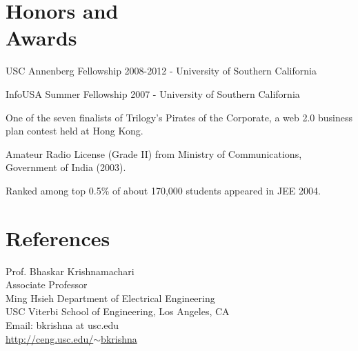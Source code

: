 \documentclass[margin,line]{resume}
\begin{document}
\begin{resume}
    
\section{\mysidestyle Honors and\\Awards} 
\begin{list2}
	  \item USC Annenberg Fellowship 2008-2012	- University of Southern California
          \item InfoUSA Summer Fellowship 2007	- University of Southern California %
	  \item One of the seven finalists of Trilogy's Pirates of the Corporate, a web 2.0 business plan contest held at Hong Kong. %
	  \item Amateur Radio License (Grade II) from Ministry of Communications, Government of India (2003).%
	  \item Ranked among top 0.5\% of about 170,000 students appeared in JEE 2004. \\%
\end{list2}
  

\section{\mysidestyle References} 
Prof. Bhaskar Krishnamachari \\
Associate Professor \\
Ming Hsieh Department of Electrical Engineering \\
USC Viterbi School of Engineering, Los Angeles, CA \\
Email: bkrishna at usc.edu \\
\href{http://ceng.usc.edu/~bkrishna}{http://ceng.usc.edu/$\sim$bkrishna}


\end{resume}
\end{document}
